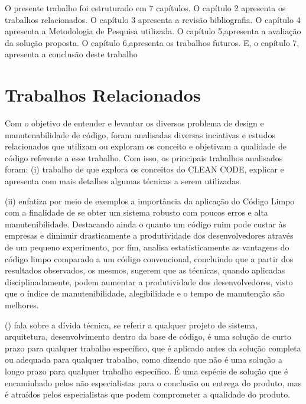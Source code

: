 \documentclass[12pt]{article}
\begin{document}
O presente trabalho foi estruturado em 7 capítulos.
O capítulo 2 apresenta os trabalhos relacionados. 
O capítulo 3 apresenta a revisão bibliografia.
O capítulo 4 apresenta a Metodologia de Pesquisa utilizada. 
O capítulo 5,apresenta a avaliação da solução proposta.
O capítulo 6,apresenta os trabalhos futuros.
E, o capítulo 7, apresenta a conclusão deste trabalho

\part{Trabalhos Relacionados} \label{sec:trabalhosrelacionados}

Com o objetivo de entender e levantar os diversos problema de design e manutenabilidade de código, foram analisadas diversas inciativas e estudos relacionados que utilizam ou exploram os conceito e objetivam a qualidade de código referente a esse trabalho.
Com isso, os principais trabalhos analisados foram: (i) trabalho de \cite{TR_CLEAN_CODE_INTRODUCAO} que explora os conceitos do CLEAN CODE, explicar e apresenta com mais detalhes algumas técnicas a serem utilizadas.

 (ii) \cite{TR_CLEAN_CODE_IMPORTANCIA} enfatiza por meio de exemplos a importância da aplicação do
Código Limpo com a finalidade de se obter um sistema robusto com poucos erros e alta manutenibilidade. Destacando ainda o quanto um código ruim pode custar às empresas e diminuir drasticamente a produtividade dos desenvolvedores através de um pequeno experimento, por fim, analisa estatisticamente as vantagens do código limpo comparado a um código convencional, concluindo que a partir dos resultados observados, os mesmos, sugerem que as técnicas, quando aplicadas disciplinadamente, podem aumentar a produtividade dos desenvolvedores, visto que o índice de manutenibilidade, alegibilidade e o tempo de manutenção são melhores.
 
 () \cite{TR_QC_TECHNICAL_DEBT} fala sobre a dívida técnica, se referir a qualquer projeto de sistema, arquitetura, desenvolvimento dentro da base de código, é uma solução de curto prazo para qualquer trabalho específico, que é aplicado antes da solução completa ou adequada para
qualquer trabalho, como dizendo que não é uma solução a longo prazo para qualquer trabalho específico. É uma espécie de solução que é encaminhado pelos não especialistas para o conclusão ou entrega do produto, mas é atraídos pelos especialistas que podem comprometer a qualidade do produto.
\end{document}
